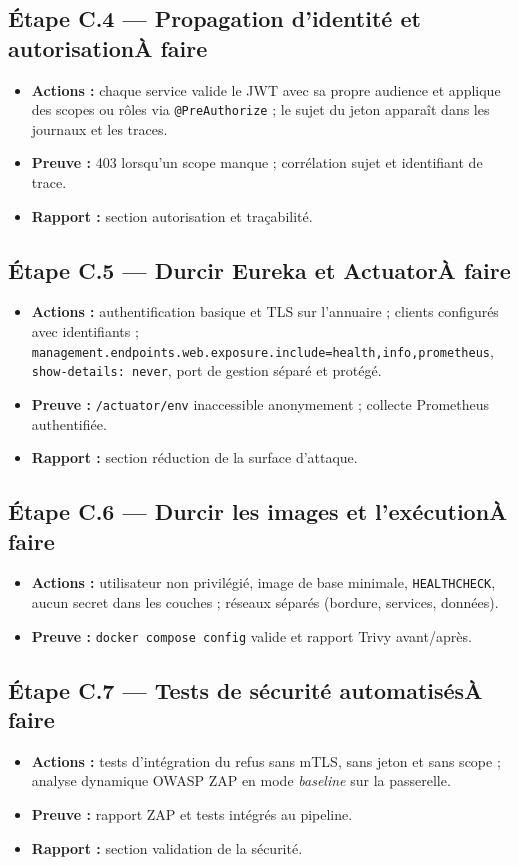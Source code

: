 \documentclass[12pt,a4paper]{article}
\newcommand{\code}[1]{\texttt{\small #1}}
\newcommand{\fait}{\hfill\textcolor{green!45!black}{\small\textbf{Fait}}}
\newcommand{\afaire}{\hfill\textcolor{orange!80!black}{\small\textbf{\`A faire}}}
\newcommand{\etape}[2]{%
  \subsection*{#1\ifstrequal{#2}{f}{\fait}{\afaire}}%
}
\begin{document}
\etape{\'Etape C.4 --- Propagation d'identit\'e et autorisation}{a}
\begin{itemize}[leftmargin=1.4em,itemsep=0.1em]
  \item \textbf{Actions :} chaque service valide le JWT avec sa propre audience et applique
        des scopes ou r\^oles via \code{@PreAuthorize} ; le sujet du jeton appara\^it dans
        les journaux et les traces.
  \item \textbf{Preuve :} 403 lorsqu'un scope manque ; corr\'elation sujet et identifiant de trace.
  \item \textbf{Rapport :} section autorisation et tra\c{c}abilit\'e.
\end{itemize}

\etape{\'Etape C.5 --- Durcir Eureka et Actuator}{a}
\begin{itemize}[leftmargin=1.4em,itemsep=0.1em]
  \item \textbf{Actions :} authentification basique et TLS sur l'annuaire ; clients configur\'es
        avec identifiants ; \code{management.endpoints.web.exposure.include=health,info,prometheus},
        \code{show-details: never}, port de gestion s\'epar\'e et prot\'eg\'e.
  \item \textbf{Preuve :} \code{/actuator/env} inaccessible anonymement ; collecte Prometheus authentifi\'ee.
  \item \textbf{Rapport :} section r\'eduction de la surface d'attaque.
\end{itemize}

\etape{\'Etape C.6 --- Durcir les images et l'ex\'ecution}{a}
\begin{itemize}[leftmargin=1.4em,itemsep=0.1em]
  \item \textbf{Actions :} utilisateur non privil\'egi\'e, image de base minimale,
        \code{HEALTHCHECK}, aucun secret dans les couches ; r\'eseaux s\'epar\'es
        (bordure, services, donn\'ees).
  \item \textbf{Preuve :} \code{docker compose config} valide et rapport Trivy avant/apr\`es.
\end{itemize}

\etape{\'Etape C.7 --- Tests de s\'ecurit\'e automatis\'es}{a}
\begin{itemize}[leftmargin=1.4em,itemsep=0.1em]
  \item \textbf{Actions :} tests d'int\'egration du refus sans mTLS, sans jeton et sans scope ;
        analyse dynamique OWASP ZAP en mode \emph{baseline} sur la passerelle.
  \item \textbf{Preuve :} rapport ZAP et tests int\'egr\'es au pipeline.
  \item \textbf{Rapport :} section validation de la s\'ecurit\'e.
\end{itemize}
\end{document}
